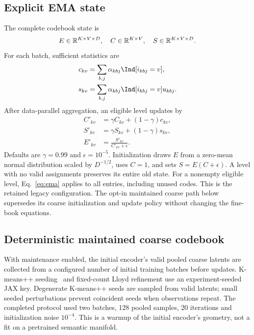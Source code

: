 \documentclass[11pt,a4paper]{article}
\begin{document}
\subsection{Explicit EMA state}
The complete codebook state is
\begin{equation}
 E\in\mathbb{R}^{K\times V\times D},\quad
 C\in\mathbb{R}^{K\times V},\quad
 S\in\mathbb{R}^{K\times V\times D}.
\end{equation}
For each batch, sufficient statistics are
\begin{align}
 c_{kv}&=\sum_{b,j}\alpha_{kbj}\Ind[i_{kbj}=v],\\
 s_{kv}&=\sum_{b,j}\alpha_{kbj}\Ind[i_{kbj}=v]u_{kbj}.
\end{align}
After data-parallel aggregation, an eligible level updates by
\begin{align}
 C'_{kv}&=\gamma C_{kv}+(1-\gamma)c_{kv},\\
 S'_{kv}&=\gamma S_{kv}+(1-\gamma)s_{kv},\\
 E'_{kv}&=\frac{S'_{kv}}{C'_{kv}+\epsilon}.
 \label{eq:ema}
\end{align}
Defaults are \(\gamma=0.99\) and \(\epsilon=10^{-5}\). Initialization draws
\(E\) from a zero-mean normal distribution scaled by \(D^{-1/2}\), uses
\(C=1\), and sets \(S=E(C+\epsilon)\). A level with no valid assignments
preserves its entire old state. For a nonempty eligible level, Eq.~\eqref{eq:ema}
applies to all entries, including unused codes. This is the retained legacy
configuration. The opt-in maintained coarse path below supersedes its coarse
initialization and update policy without changing the fine-book equations.


\subsection{Deterministic maintained coarse codebook}
\label{sec:maintenance}
With maintenance enabled, the initial encoder's valid pooled coarse latents are
collected from a configured number of initial training batches before updates.
K-means++ seeding~\citep{arthur2007kmeans} and fixed-count Lloyd refinement use
an experiment-seeded JAX key. Degenerate K-means++ seeds are sampled from valid latents;
small seeded perturbations prevent coincident seeds when observations repeat.
The completed protocol used two batches, 128 pooled samples, 20 iterations and
initialization noise \(10^{-4}\). This is a warmup of the initial encoder's
geometry, not a fit on a pretrained semantic manifold.
\end{document}
